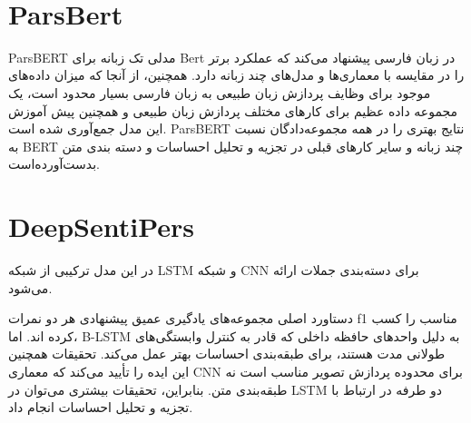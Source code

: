\\

\section{ParsBert}

ParsBERT \cite{Mehrdad2020ParsBERT} 
‌مدلی تک زبانه برای Bert در ‌زبان فارسی پیشنهاد می‌کند که عملکرد برتر را در مقایسه با معماری‌ها و مدل‌های چند زبانه دارد. همچنین، از آنجا که میزان داده‌های موجود برای وظایف پردازش زبان طبیعی به زبان فارسی بسیار محدود است، یک مجموعه داده عظیم برای کارهای مختلف پردازش زبان طبیعی و همچنین پیش آموزش این مدل جمع‌آوری شده است. ParsBERT نتایج بهتری را در همه مجموعه‌دادگان نسبت به BERT چند زبانه و سایر کارهای قبلی در تجزیه و تحلیل احساسات و دسته بندی متن بدست‌آورده‌است.


\section{DeepSentiPers}
در این مدل
\cite{Javad2020DeepSentiPers}
ترکیبی از شبکه 
LSTM 
\cite{Sepp1997LSTM}
\cite{Dimensional}
و 
شبکه
CNN
\cite{lecun1989handwritten}
\cite{lecun2015deep}
برای دسته‌بندی جملات ارائه می‌شود.

دستاورد اصلی مجموعه‌های یادگیری عمیق پیشنهادی هر دو نمرات f1 مناسب را کسب کرده اند.  اما، B-LSTM به دلیل واحدهای حافظه داخلی که قادر به کنترل وابستگی‌های طولانی مدت هستند، برای طبقه‌بندی احساسات بهتر عمل می‌کند.  تحقیقات همچنین این ایده را تأیید می‌کند که معماری CNN برای محدوده پردازش تصویر مناسب است نه طبقه‌بندی متن.  بنابراین، تحقیقات بیشتری می‌توان در LSTM دو طرفه در ارتباط با تجزیه و تحلیل احساسات انجام داد.

